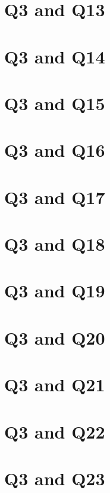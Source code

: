 \documentclass{report}
\begin{document}
\clearpage
\section{Q3 and Q13}


\clearpage
\section{Q3 and Q14}


\clearpage
\section{Q3 and Q15}


\clearpage
\section{Q3 and Q16}


\clearpage
\section{Q3 and Q17}


\clearpage
\section{Q3 and Q18}


\clearpage
\section{Q3 and Q19}


\clearpage
\section{Q3 and Q20}


\clearpage
\section{Q3 and Q21}


\clearpage
\section{Q3 and Q22}


\clearpage
\section{Q3 and Q23}

\end{document}
